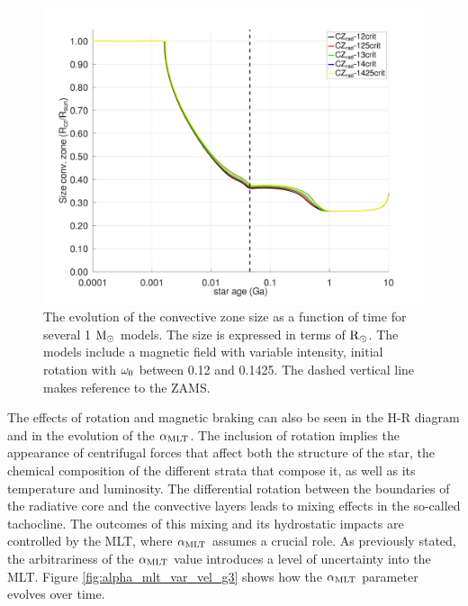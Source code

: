 \documentclass[fleqn,usenatbib]{mnras}
\begin{document}
\begin{figure}
	\includegraphics[clip,width=\columnwidth]{figures/paper2/cz_var_vel_var_g3.pdf}
    \caption{The evolution of the convective zone size as a function of time for several 1 $\mathrm{M}_\odot$ models. The size is expressed in terms of $\mathrm{R}_\odot$. The models include a magnetic field with variable intensity, initial rotation with $\omega_{\mathrm{0}}$ between 0.12 and 0.1425. The dashed vertical line makes reference to the ZAMS.}
    \label{fig:cz_var_vel_var_g3}
\end{figure}


The effects of rotation and magnetic braking can also be seen in the H-R diagram and in the evolution of the $\alpha_{\mathrm{MLT}}$. The inclusion of rotation implies the appearance of centrifugal forces that affect both the structure of the star, the chemical composition of the different strata that compose it, as well as its temperature and luminosity. The differential rotation between the boundaries of the radiative core and the convective layers leads to mixing effects in the so-called tachocline. The outcomes of this mixing and its hydrostatic impacts are controlled by the MLT, where $\alpha_{\mathrm{MLT}}$ assumes a crucial role. As previously stated, the arbitrariness of the $\alpha_{\mathrm{MLT}}$ value introduces a level of uncertainty into the MLT. Figure \ref{fig:alpha_mlt_var_vel_g3} shows how the $\alpha_{\mathrm{MLT}}$ parameter evolves over time.\par 

\end{document}
